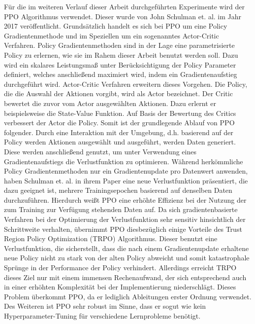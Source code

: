 Für die im weiteren Verlauf dieser Arbeit durchgeführten Experimente wird der \ac{PPO} Algorithmus verwendet. Dieser wurde von John Schulman et. al. im Jahr 2017 veröffentlicht. Grundsätzlich handelt es sich bei \ac{PPO} um eine Policy Gradientenmethode und im Speziellen um ein sogenanntes Actor-Critic Verfahren. Policy Gradientenmethoden sind in der Lage eine parametrisierte Policy zu erlernen, wie sie im Rahem dieser Arbeit benutzt werden soll. Dazu wird ein skalares Leistungsmaß unter Berücksichtigung der Policy Parameter definiert, welches anschließend maximiert wird, indem ein Gradientenaufstieg durchgeführt wird. Actor-Critic Verfahren erweitern dieses Vorgehen. Die Policy, die die Auswahl der Aktionen vorgibt, wird als Actor bezeichnet. Der Critic bewertet die zuvor vom Actor ausgewählten Aktionen. Dazu erlernt er beispielsweise die State-Value Funktion. Auf Basis der Bewertung des Critics verbessert der Actor die Policy. Somit ist der grundlegende Ablauf von \ac{PPO} folgender. Durch eine Interaktion mit der Umgebung, d.h. basierend auf der Policy werden Aktionen ausgewählt und ausgeführt, werden Daten generiert. Diese werden anschließend genutzt, um unter Verwendung eines Gradientenaufstiegs die Verlustfunktion zu optimieren. Während herkömmliche Policy Gradientenmethoden nur ein Gradientenupdate pro Datenwert anwenden, haben Schulman et. al. in ihrem Paper eine neue Verlustfunktion präsentiert, die dazu geeignet ist, mehrere Trainingsepochen basierend auf denselben Daten durchzuführen. Hierdurch weißt \ac{PPO} eine erhöhte Effizienz bei der Nutzung der zum Training zur Verfügung stehenden Daten auf. Da sich gradientenbasierte Verfahren bei der Optimierung der Verlustfunktion sehr sensitiv hinsichtlich der Schrittweite verhalten, übernimmt \ac{PPO} diesbezüglich einige Vorteile des Trust Region Policy Optimization (TRPO) Algorithmus. Dieser benutzt eine Verlustfunktion, die sicherstellt, dass die nach einem Gradientenupdate erhaltene neue Policy nicht zu stark von der alten Policy abweicht und somit katastrophale Sprünge in der Performance der Policy verhindert. Allerdings erreicht TRPO dieses Ziel nur mit einem immensen Rechenaufwand, der sich entsprechend auch in einer erhöhten Komplexität bei der Implementierung niederschlägt. Dieses Problem überkommt \ac{PPO}, da er lediglich Ableitungen erster Ordnung verwendet. Des Weiteren ist \ac{PPO} sehr robust im Sinne, dass er sogut wie kein Hyperparameter-Tuning für verschiedene Lernprobleme benötigt. \\

